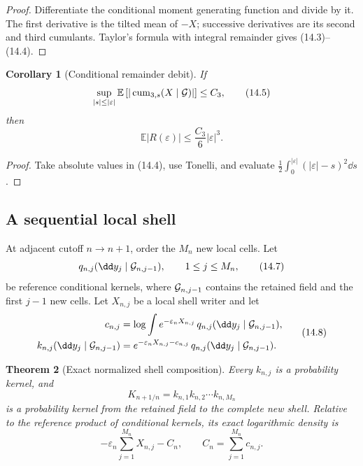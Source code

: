 \documentclass[11pt]{article}
\newtheorem{theorem}{Theorem}[section]
\newtheorem{corollary}[theorem]{Corollary}
\theoremstyle{remark}
\begin{document}
\begin{proof}
Differentiate the conditional moment generating function and
divide by it.  The first derivative is the tilted mean of \(-X\);
successive derivatives are its second and third cumulants.  Taylor's
formula with integral remainder gives (14.3)--(14.4).
\end{proof}

\begin{corollary}[Conditional remainder debit]
\label{cor:v17v14-one-debit}
If
\[
 \sup_{|s|\leq|\varepsilon|}
 \mathbb E\left[
 |\operatorname{cum}_{3,s}(X\mid{\cal G})|
 \right]\leq C_3,                                  \tag{14.5}
\]
then
\[
 \mathbb E|R(\varepsilon)|
 \leq\frac{C_3}{6}|\varepsilon|^3.                 \tag{14.6}
\]
\end{corollary}

\begin{proof}
Take absolute values in (14.4), use Tonelli, and evaluate
\(\frac12\int_0^{|\varepsilon|}(|\varepsilon|-s)^2\dd s\).
\end{proof}

\subsection{A sequential local shell}

At adjacent cutoff \(n\to n+1\), order the \(M_n\) new local cells.
Let
\[
 q_{n,j}(\dd y_j\mid{\cal G}_{n,j-1}),
 \qquad 1\leq j\leq M_n,                           \tag{14.7}
\]
be reference conditional kernels, where \({\cal G}_{n,j-1}\)
contains the retained field and the first \(j-1\) new cells.  Let
\(X_{n,j}\) be a local shell writer and let
\[
\begin{aligned}
 c_{n,j}
 &=\log\int e^{-\varepsilon_nX_{n,j}}\,
 q_{n,j}(\dd y_j\mid{\cal G}_{n,j-1}),\\
 k_{n,j}(\dd y_j\mid{\cal G}_{n,j-1})
 &=e^{-\varepsilon_nX_{n,j}-c_{n,j}}\,
 q_{n,j}(\dd y_j\mid{\cal G}_{n,j-1}).
\end{aligned}                                                       \tag{14.8}
\]

\begin{theorem}[Exact normalized shell composition]
\label{thm:v17v14-exact-shell}
Every \(k_{n,j}\) is a probability kernel, and
\[
 K_{n+1/n}=k_{n,1}k_{n,2}\cdots k_{n,M_n}           \tag{14.9}
\]
is a probability kernel from the retained field to the complete
new shell.  Relative to the reference product of conditional
kernels, its exact logarithmic density is
\[
 -\varepsilon_n\sum_{j=1}^{M_n}X_{n,j}
 -C_n,
 \qquad
 C_n=\sum_{j=1}^{M_n}c_{n,j}.                      \tag{14.10}
\]
\end{theorem}
\end{document}
